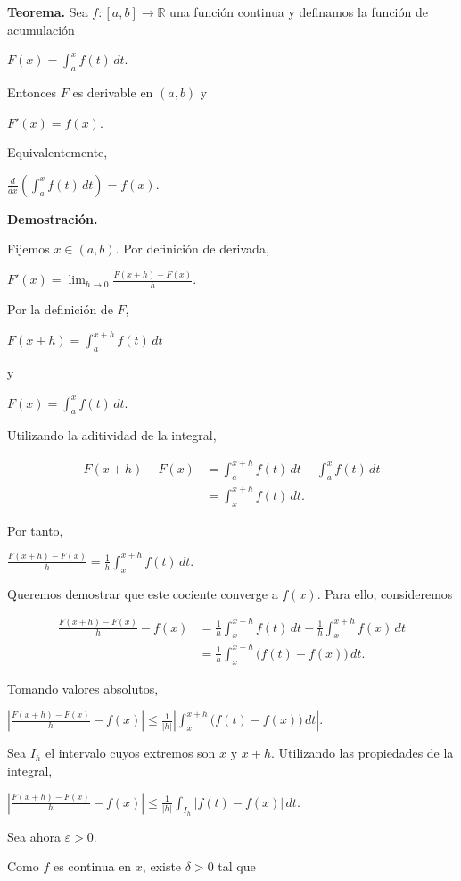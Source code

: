 \documentclass[12pt]{article}
\begin{document}
\textbf{Teorema.}
Sea
$
f:[a,b]\longrightarrow\mathbb{R}
$
una función continua y definamos la función de acumulación

$
F(x)=\int_a^x f(t)\,dt.
$

Entonces $F$ es derivable en $(a,b)$ y

$
\boxed{
F'(x)=f(x).
}
$

Equivalentemente,

$
\boxed{
\frac{d}{dx}
\left(
\int_a^x f(t)\,dt
\right)
=f(x).
}
$

\textbf{Demostración.}

Fijemos $x\in(a,b)$. Por definición de derivada,

$
F'(x)
=
\lim_{h\to0}
\frac{F(x+h)-F(x)}{h}.
$

Por la definición de $F$,

$
F(x+h)=\int_a^{x+h}f(t)\,dt
$

y

$
F(x)=\int_a^x f(t)\,dt.
$

Utilizando la aditividad de la integral,

\begin{align*}
F(x+h)-F(x)
&=
\int_a^{x+h}f(t)\,dt
-
\int_a^x f(t)\,dt\\
&=
\int_x^{x+h}f(t)\,dt.
\end{align*}

Por tanto,

$
\frac{F(x+h)-F(x)}{h}
=
\frac{1}{h}
\int_x^{x+h}f(t)\,dt.
$

Queremos demostrar que este cociente converge a $f(x)$. Para ello,
consideremos

\begin{align*}
\frac{F(x+h)-F(x)}{h}-f(x)
&=
\frac{1}{h}\int_x^{x+h}f(t)\,dt
-
\frac{1}{h}\int_x^{x+h}f(x)\,dt\\
&=
\frac{1}{h}
\int_x^{x+h}
\bigl(f(t)-f(x)\bigr)\,dt.
\end{align*}

Tomando valores absolutos,

$
\left|
\frac{F(x+h)-F(x)}{h}-f(x)
\right|
\leq
\frac{1}{|h|}
\left|
\int_x^{x+h}
\bigl(f(t)-f(x)\bigr)\,dt
\right|.
$

Sea $I_h$ el intervalo cuyos extremos son $x$ y $x+h$. Utilizando las
propiedades de la integral,

$
\left|
\frac{F(x+h)-F(x)}{h}-f(x)
\right|
\leq
\frac{1}{|h|}
\int_{I_h}
|f(t)-f(x)|\,dt.
$

Sea ahora $\varepsilon>0$.

Como $f$ es continua en $x$, existe $\delta>0$ tal que
\end{document}
